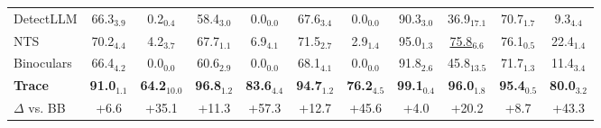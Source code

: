 \begin{tabular}{lcccccccccc}
DetectLLM & 66.3$_{3.9}$ & 0.2$_{0.4}$ & 58.4$_{3.0}$ & 0.0$_{0.0}$ & 67.6$_{3.4}$ & 0.0$_{0.0}$ & 90.3$_{3.0}$ & 36.9$_{17.1}$ & 70.7$_{1.7}$ & 9.3$_{4.4}$ \\
NTS & 70.2$_{4.4}$ & 4.2$_{3.7}$ & 67.7$_{1.1}$ & 6.9$_{4.1}$ & 71.5$_{2.7}$ & 2.9$_{1.4}$ & 95.0$_{1.3}$ & \cellcolor{orange!25}\underline{75.8$_{6.6}$} & 76.1$_{0.5}$ & 22.4$_{1.4}$ \\
Binoculars & 66.4$_{4.2}$ & 0.0$_{0.0}$ & 60.6$_{2.9}$ & 0.0$_{0.0}$ & 68.1$_{4.1}$ & 0.0$_{0.0}$ & 91.8$_{2.6}$ & 45.8$_{13.5}$ & 71.7$_{1.3}$ & 11.4$_{3.4}$ \\
\midrule
\textbf{Trace} & \cellcolor{cyan!25}\textbf{91.0$_{1.1}$} & \cellcolor{cyan!25}\textbf{64.2$_{10.0}$} & \cellcolor{cyan!25}\textbf{96.8$_{1.2}$} & \cellcolor{cyan!25}\textbf{83.6$_{4.4}$} & \cellcolor{cyan!25}\textbf{94.7$_{1.2}$} & \cellcolor{cyan!25}\textbf{76.2$_{4.5}$} & \cellcolor{cyan!25}\textbf{99.1$_{0.4}$} & \cellcolor{cyan!25}\textbf{96.0$_{1.8}$} & \cellcolor{cyan!25}\textbf{95.4$_{0.5}$} & \cellcolor{cyan!25}\textbf{80.0$_{3.2}$} \\
$\Delta$ vs. BB & \textcolor{green!60!black}{+6.6} & \textcolor{green!60!black}{+35.1} & \textcolor{green!60!black}{+11.3} & \textcolor{green!60!black}{+57.3} & \textcolor{green!60!black}{+12.7} & \textcolor{green!60!black}{+45.6} & \textcolor{green!60!black}{+4.0} & \textcolor{green!60!black}{+20.2} & \textcolor{green!60!black}{+8.7} & \textcolor{green!60!black}{+43.3} \\
\bottomrule
\end{tabular}
